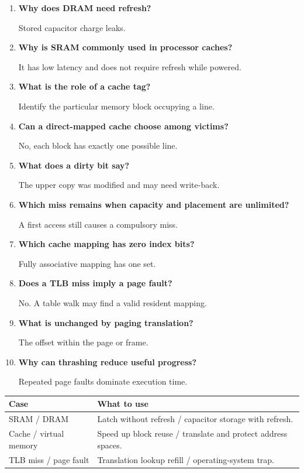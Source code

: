 \documentclass[12pt,a4paper]{article}
\newcommand{\Q}[1]{\textbf{#1}\par\noindent\ignorespaces}
\begin{document}
\begin{tcolorbox}[exambox,title={Frequently Asked / Viva Questions}]
\begin{enumerate}[topsep=0pt, label=\textbf{Q\arabic*.}, itemsep=5pt]
\item \Q{Why does DRAM need refresh?}
Stored capacitor charge leaks.
\item \Q{Why is SRAM commonly used in processor caches?}
It has low latency and does not require refresh while powered.
\item \Q{What is the role of a cache tag?}
Identify the particular memory block occupying a line.
\item \Q{Can a direct-mapped cache choose among victims?}
No, each block has exactly one possible line.
\item \Q{What does a dirty bit say?}
The upper copy was modified and may need write-back.
\item \Q{Which miss remains when capacity and placement are unlimited?}
A first access still causes a compulsory miss.
\item \Q{Which cache mapping has zero index bits?}
Fully associative mapping has one set.
\item \Q{Does a TLB miss imply a page fault?}
No. A table walk may find a valid resident mapping.
\item \Q{What is unchanged by paging translation?}
The offset within the page or frame.
\item \Q{Why can thrashing reduce useful progress?}
Repeated page faults dominate execution time.
\end{enumerate}
\end{tcolorbox}
\begin{tcolorbox}[tikzbox,title={Summary comparison}]
\begin{tabularx}{\linewidth}{|B{4cm}|Y|}\hline
\textbf{Case} & \textbf{What to use} \\ \hline
SRAM / DRAM & Latch without refresh / capacitor storage with refresh. \\ \hline
Cache / virtual memory & Speed up block reuse / translate and protect address spaces. \\ \hline
TLB miss / page fault & Translation lookup refill / operating-system trap. \\ \hline
\end{tabularx}
\end{tcolorbox}
\end{document}
